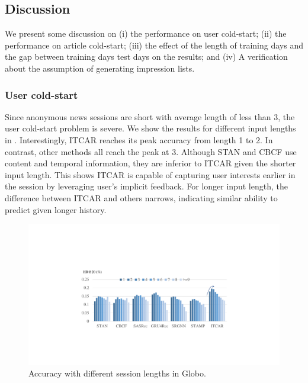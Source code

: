 \subsection{Discussion}
\label{sec:discuss}
We present some discussion on (i) the performance on user cold-start; 
(ii) the performance on article cold-start; (iii) the effect of the length of
training days and the gap between training days test days on the results; and 
(iv) A verification about the assumption of generating impression lists.

\subsubsection{User cold-start}
\label{sec:usercold}
Since anonymous news sessions are short with average length of less than 3, 
the user cold-start problem is severe. We show the results for different input lengths in 
. Interestingly, ITCAR reaches its peak accuracy from length 1 to 2. 
In contrast, other methods all reach the peak at 3. 
Although STAN and CBCF use content and temporal information, 
they are inferior to ITCAR given the shorter input length. 
This shows ITCAR is capable of capturing user interests earlier in the session 
by leveraging user's implicit feedback. For longer input length, 
the difference between ITCAR and others narrows, 
indicating similar ability to predict given longer history. 

\begin{figure}[th]
  \centering
  \includegraphics[width=\columnwidth]{fig/input_len.pdf}
  \caption{Accuracy with different session lengths in Globo.}
  \label{fig:inputlen}
\end{figure}

